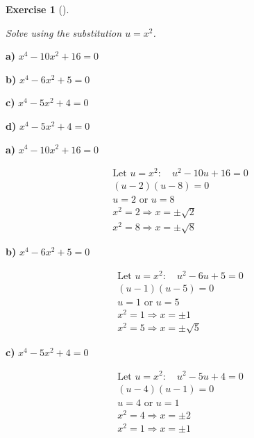 \documentclass[
  letterpaper,
  DIV=11,
  numbers=noendperiod]{scrreprt}
\theoremstyle{definition}
\newtheorem{exercise}{Exercise}[chapter]
\theoremstyle{remark}
\begin{document}
\begin{exercise}[]\protect\hypertarget{exr-u6-35}{}\label{exr-u6-35}

\emph{Solve using the substitution \(u = x^2\).}

\textbf{a)} \(\displaystyle x^4 -10x^2 + 16 = 0\)

\textbf{b)} \(\displaystyle x^4 -6x^2 + 5 = 0\)

\textbf{c)} \(\displaystyle x^4 -5x^2 + 4 = 0\)

\textbf{d)} \(\displaystyle x^4 -5x^2 + 4 = 0\)

\begin{tcolorbox}[enhanced jigsaw, opacitybacktitle=0.6, coltitle=black, arc=.35mm, colframe=quarto-callout-tip-color-frame, colback=white, bottomrule=.15mm, left=2mm, colbacktitle=quarto-callout-tip-color!10!white, titlerule=0mm, opacityback=0, title=\textcolor{quarto-callout-tip-color}{\faLightbulb}\hspace{0.5em}{🔍 View Solutions}, leftrule=.75mm, breakable, rightrule=.15mm, bottomtitle=1mm, toptitle=1mm, toprule=.15mm]

\textbf{a)} \(\displaystyle x^4 -10x^2 + 16 = 0\)

\begin{align*}
\text{Let } u = x^2: \quad u^2 -10u + 16 = 0 \\ (u -2)(u -8) = 0 \\ u = 2 \text{ or } u = 8 \\ x^2 = 2 \Rightarrow x = \pm\sqrt{2} \\ x^2 = 8 \Rightarrow x = \pm\sqrt{8}
\end{align*}

\textbf{b)} \(\displaystyle x^4 -6x^2 + 5 = 0\)

\begin{align*}
\text{Let } u = x^2: \quad u^2 -6u + 5 = 0 \\ (u -1)(u -5) = 0 \\ u = 1 \text{ or } u = 5 \\ x^2 = 1 \Rightarrow x = \pm1 \\ x^2 = 5 \Rightarrow x = \pm\sqrt{5}
\end{align*}

\textbf{c)} \(\displaystyle x^4 -5x^2 + 4 = 0\)

\begin{align*}
\text{Let } u = x^2: \quad u^2 -5u + 4 = 0 \\ (u -4)(u -1) = 0 \\ u = 4 \text{ or } u = 1 \\ x^2 = 4 \Rightarrow x = \pm 2 \\ x^2 = 1 \Rightarrow x = \pm 1
\end{align*}


\end{tcolorbox}
\end{exercise}
\end{document}
